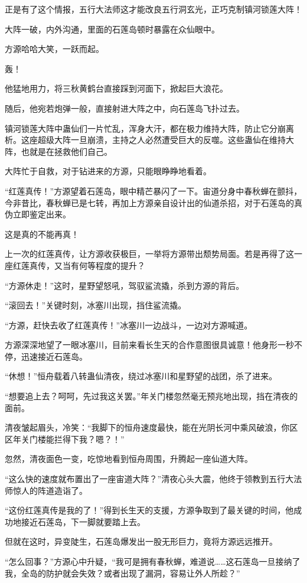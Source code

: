 \begin{this_body}
正是有了这个情报，五行大法师这才能改良五行洞玄光，正巧克制镇河锁莲大阵！

大阵一破，内外沟通，里面的石莲岛顿时暴露在众仙眼中。

方源哈哈大笑，一跃而起。

轰！

他猛地用力，将三秋黄鹤台直接踩到河面下，掀起巨大浪花。

随后，他宛若炮弹一般，直接射进大阵之中，向石莲岛飞扑过去。

镇河锁莲大阵中蛊仙们一片忙乱，浑身大汗，都在极力维持大阵，防止它分崩离析。这座超级大阵一旦崩溃，主持之人必然遭受巨大的反噬。这些蛊仙在维持大阵，也就是在拯救他们自己。

大阵忙于自救，对于钻进来的方源，只能眼睁睁地看着。

“红莲真传！”方源望着石莲岛，眼中精芒暴闪了一下。宙道分身中春秋蝉在颤抖，今非昔比，春秋蝉已是七转，再加上方源亲自设计出的仙道杀招，对于石莲岛的真伪立即鉴定出来。

这是真的不能再真！

上一次的红莲真传，让方源收获极巨，一举将方源带出颓势局面。若是再得了这一座红莲真传，又当有何等程度的提升？

“方源休走！”这时，星野望怒吼，驾驭鲨流撬，杀到方源的背后。

“滚回去！”关键时刻，冰塞川出现，挡住鲨流撬。

“方源，赶快去收了红莲真传！”冰塞川一边战斗，一边对方源喊道。

方源深深地望了一眼冰塞川，目前来看长生天的合作意图很具诚意！他身形一秒不停，迅速接近石莲岛。

“休想！”恒舟载着八转蛊仙清夜，绕过冰塞川和星野望的战团，杀了进来。

“想要追上去？呵呵，先过我这关罢。”年关门楼忽然毫无预兆地出现，挡在清夜的面前。

清夜皱起眉头，冷笑：“我脚下的恒舟速度最快，能在光阴长河中乘风破浪，你区区年关门楼能拦得下我？嗯？！”

忽然，清夜面色一变，吃惊地看到恒舟周围，升腾起一座仙道大阵。

“这么快的速度就布置出了一座宙道大阵？”清夜心头大震，他终于领教到五行大法师惊人的阵道造诣了。

“这份红莲真传是我的了！”得到长生天的支援，方源争取到了最关键的时间，他成功地接近石莲岛，下一脚就要踏上去。

但就在这时，异变陡生，石莲岛爆发出一股无形巨力，竟将方源远远推开。

“怎么回事？”方源心中升疑，“我可是拥有春秋蝉，难道说……这石莲岛一旦接纳了我，全岛的防护就会失效？或者出现了漏洞，容易让外人所趁？”


\end{this_body}
